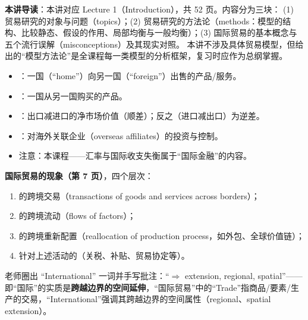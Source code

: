 
\textbf{本讲导读}：本讲对应 Lecture 1（Introduction），共 52 页。内容分为三块：
(1) 贸易研究的对象与问题（topics）；(2) 贸易研究的方法论（methods：模型的结构、比较静态、假设的作用、局部均衡与一般均衡）；(3) 国际贸易的基本概念与五个流行误解（misconceptions）及其现实对照。
本讲不涉及具体贸易模型，但给出的``模型方法论''是全课程每一类模型的分析框架，复习时应作为总纲掌握。


\begin{defbox}
\begin{itemize}
  \item {}：一国（``home''）向另一国（``foreign''）出售的产品/服务。
  \item {}：一国从另一国购买的产品。
  \item {}：出口减进口的净市场价值（顺差）；反之（进口减出口）为逆差。
  \item {}：对海外关联企业（overseas affiliates）的投资与控制。
  \item 注意：本课程——汇率与国际收支失衡属于``国际金融''的内容。
\end{itemize}
\end{defbox}

\textbf{国际贸易的现象（第 7 页）}，四个层次：
\begin{enumerate}
  \item {}的跨境交易（transactions of goods and services across borders）；
  \item {}的跨境流动（flows of factors）；
  \item {}的跨境重新配置（reallocation of production process，如外包、全球价值链）；
  \item 针对上述活动的（关税、补贴、贸易协定等）。
\end{enumerate}

\begin{intubox}[课堂手写批注（第 7 页）]
老师圈出 ``International'' 一词并手写批注：``$\Rightarrow$ extension, regional, spatial''——
即``国际''的实质是\textbf{跨越边界的空间延伸}，``国际贸易''中的``Trade''指商品/要素/生产的交易，``International''强调其跨越边界的空间属性（regional、spatial extension）。
\end{intubox}

